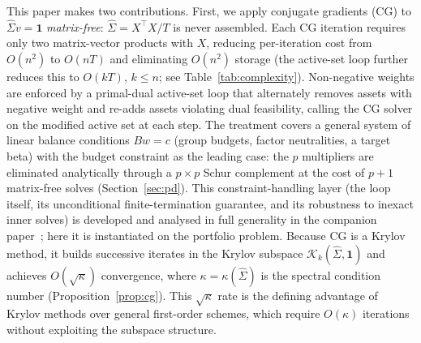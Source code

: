This paper makes two contributions. First, we apply conjugate gradients (CG) to
$\hat \Sigma v = \mathbf{1}$ \emph{matrix-free}: $\hat \Sigma = X^\top X/T$ is never
assembled. Each CG iteration requires only two matrix-vector products with $X$, reducing
per-iteration cost from $O(n^2)$ to $O(nT)$ and eliminating $O(n^2)$ storage (the active-set loop further reduces this to $O(kT)$, $k \leq n$; see Table~\ref{tab:complexity}).
Non-negative weights are enforced by a primal-dual active-set loop that alternately removes
assets with negative weight and re-adds assets violating dual feasibility, calling the CG
solver on the modified active set at each step. The treatment covers a general system
of linear balance conditions $Bw = c$ (group budgets, factor neutralities, a target
beta) with the budget constraint as the leading case: the $p$ multipliers are
eliminated analytically through a $p \times p$ Schur complement at the cost of $p+1$
matrix-free solves (Section~\ref{sec:pd}). This constraint-handling layer (the
loop itself, its unconditional finite-termination guarantee, and its robustness to
inexact inner solves) is developed and analysed in full generality in the companion
paper~\cite{schmelzer2026nncg}; here it is instantiated on the portfolio problem.
Because CG is a Krylov method, it builds
successive iterates in the Krylov subspace $\mathcal{K}_k(\hat\Sigma, \mathbf{1})$ and
achieves $O(\sqrt\kappa)$ convergence, where $\kappa = \kappa(\hat\Sigma)$
is the spectral condition number (Proposition~\ref{prop:cg}). This $\sqrt\kappa$ rate is the defining advantage
of Krylov methods over general first-order schemes, which require $O(\kappa)$
iterations without exploiting the subspace structure.

